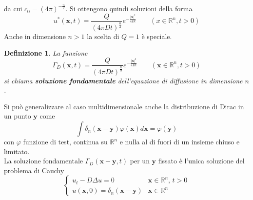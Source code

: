 \documentclass[a4paper,12pt, draft]{article}
\theoremstyle{break}
\newtheorem{definition}{Definizione}[section]
\let\phi\varphi
\numberwithin{equation}{section}
\begin{document}
da cui \(c_0 = (4\pi)^{-\frac{n}{2}}\). Si ottengono quindi soluzioni della forma
\[
  u^*(\bm{x}, t) = \frac{Q}{(4\pi Dt)^{\frac{n}{2}}}e^{-\frac{|\bm{x}|^2}{4Dt}} \qquad (x \in \mathbb{R}^n, t > 0)
\]
Anche in dimensione \(n > 1\) la scelta di \(Q = 1\) è speciale.
\begin{definition}
  La funzione 
  \[
     \Gamma_D(\bm{x}, t) = \frac{Q}{(4\pi Dt)^{\frac{n}{2}}}e^{-\frac{|\bm{x}|^2}{4Dt}} \qquad (\bm{x} \in \mathbb{R}^n, t>0)
  \]
  si chiama \textbf{soluzione fondamentale} dell'equazione di diffusione in dimensione \(n\).

\end{definition}
Si può generalizzare al caso multidimensionale anche la distribuzione di Dirac in un punto \(\bm{y}\) come
\[
\int\delta_n (\bm{x} - \bm{y}) \phi (\bm{x}) d\bm{x} = \phi(\bm{y})  
\]
con \(\phi\) funzione di test, continua su \(\mathbb{R}^n\) e nulla al di fuori di un insieme chiuso e limitato. \\
La soluzione fondamentale \(\Gamma_D(\bm{x} - \bm{y}, t)\) per un \(\bm{y}\) fissato è l'unica soluzione del problema di Cauchy
\[
  \begin{cases}
    u_t -D\Delta u = 0 & \bm{x}\in \mathbb{R}^n, \, t>0 \\
    u(\bm{x}, 0) = \delta_n (\bm{x} -\bm{y}) & \bm{x} \in \mathbb{R}^n
  \end{cases}
\]
\end{document}

